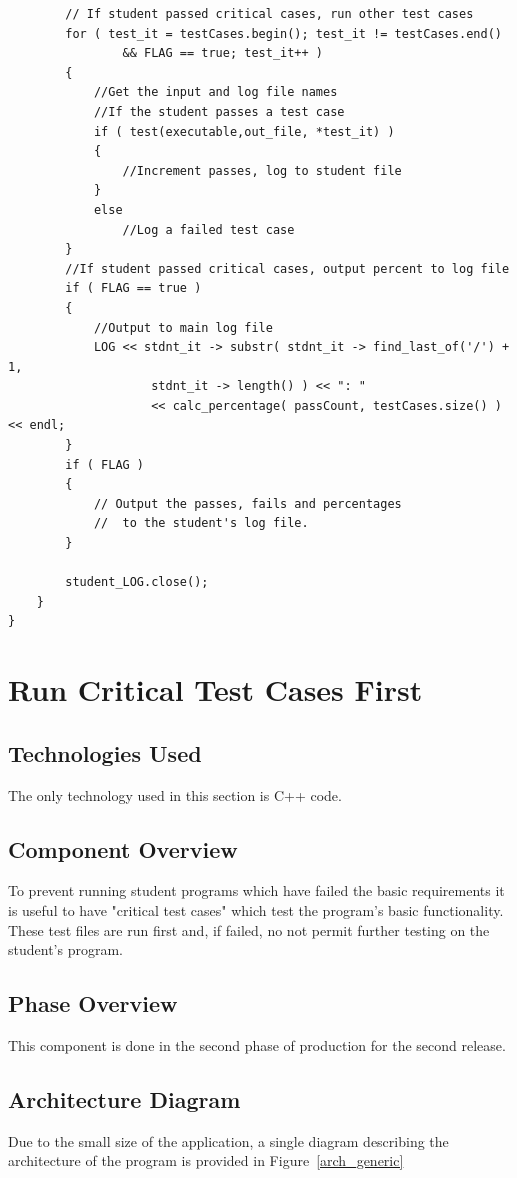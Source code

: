 \begin{lstlisting}
		// If student passed critical cases, run other test cases
        for ( test_it = testCases.begin(); test_it != testCases.end() 
        		&& FLAG == true; test_it++ )
        {
            //Get the input and log file names
            //If the student passes a test case
            if ( test(executable,out_file, *test_it) )
            {
                //Increment passes, log to student file
            }
            else
                //Log a failed test case
        }
        //If student passed critical cases, output percent to log file
        if ( FLAG == true )
        {
            //Output to main log file
            LOG << stdnt_it -> substr( stdnt_it -> find_last_of('/') + 1, 
            		stdnt_it -> length() ) << ": " 
            		<< calc_percentage( passCount, testCases.size() ) << endl;
        }
        if ( FLAG )
        {
            // Output the passes, fails and percentages 
            //  to the student's log file.
        }

        student_LOG.close();
    }
}
\end{lstlisting}

\section{Run Critical Test Cases First}

\subsection{Technologies  Used}
The only technology used in this section is C++ code.

\subsection{Component  Overview}
To prevent running student programs which have failed the basic 
requirements it is useful to have "critical test cases" which test
the program's basic functionality. These test files are run first and, 
if failed, no not permit further testing on the student's program.

\subsection{Phase Overview}
This component is done in the second phase of production for the second
release.

\subsection{ Architecture  Diagram}
Due to the small size of the application, a single diagram describing
the architecture of the program is provided in Figure~\ref{arch_generic}


